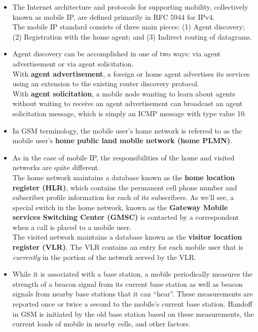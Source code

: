 \begin{itemize}
\item
The Internet architecture and protocols for supporting mobility, collectively known as mobile IP, are defined primarily in RFC 5944 for IPv4.\\
The mobile IP standard consists of three main pieces: (1) Agent discovery; (2) Registration with the home agent; and (3) Indirect routing of datagrams.

\item
Agent discovery can be accomplished in one of two ways: via agent advertisement or via agent solicitation.\\
With \textbf{agent advertisement}, a foreign or home agent advertises its services using an extension to the existing router discovery protocol.\\
With \textbf{agent solicitation}, a mobile node wanting to learn about agents without waiting to receive an agent advertisement can broadcast an agent solicitation message, which is simply an ICMP message with type value 10.

\item
In GSM terminology, the mobile user's home network is referred to as the mobile user's \textbf{home public land mobile network (home PLMN)}.

\item
As in the case of mobile IP, the responsibilities of the home and visited networks are quite different.\\
The home network maintains a database known as the \textbf{home location register (HLR)}, which contains the permanent cell phone number and subscriber profile information for each of its subscribers. As we'll see, a special switch in the home network, known as the \textbf{Gateway Mobile services Switching Center (GMSC)} is contacted by a correspondent when a call is placed to a mobile user.\\
The visited network maintains a database known as the \textbf{visitor location register (VLR)}. The VLR contains an entry for each mobile user that is \textit{currently} in the portion of the network served by the VLR.

\item
While it is associated with a base station, a mobile periodically measures the strength of a beacon signal from its current base station as well as beacon signals from nearby base stations that it can ``hear''. These measurements are reported once or twice a second to the mobile's current base station. Handoff in GSM is initiated by the old base station based on these measurements, the current loads of mobile in nearby cells, and other factors.


\end{itemize}
